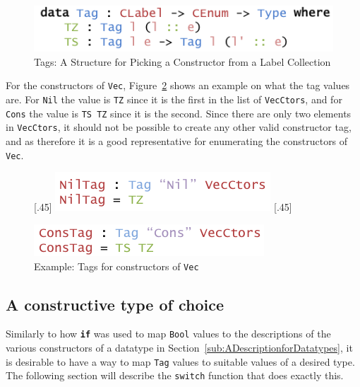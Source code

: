 \documentclass{ituthesis}
\newcommand{\ttconstructor}[1]{\textcolor{constructor-color}{\texttt{#1}}}
\newcommand{\tttype}[1]{\textcolor{type-color}{\texttt{#1}}}
\newcommand{\ttdec}[1]{\textcolor{declared-var-color}{\texttt{#1}}}
\theoremstyle{break}
\begin{document}
\begin{figure}[ht]
\begin{center}
    \includegraphics[scale=0.5]{Figures/AnInformativeEncodingofConstructorsTags.png}
\end{center}
\caption{Tags: A Structure for Picking a Constructor from a Label Collection}
\label{fig:ctortags}
\end{figure}

For the constructors of \tttype{Vec}, Figure~\ref{fig:vecctor} shows an example on what the tag values are. For \ttconstructor{Nil} the value is \ttconstructor{TZ} since it is the first in the list of \ttdec{VecCtors}, and for \ttconstructor{Cons} the value
is \ttconstructor{TS~TZ} since it is the second. Since there are only two elements in \ttdec{VecCtors}, it should not be possible to create any other valid constructor tag, and as therefore it is a good representative for enumerating the constructors of \tttype{Vec}.

\begin{figure}[ht]
\begin{center}
  \subcaptionbox{Tag for \ttconstructor{Nil}\label{fig:vecctornil}}[.45\textwidth]{
    \includegraphics[scale=0.5]{Figures/VectorNilTag.png}
}
\subcaptionbox{Tag for \ttconstructor{Cons}\label{fig:vecctorcons}}[.45\textwidth]{
    \includegraphics[scale=0.5]{Figures/VectorConsTag.png}

}
\caption{Example: Tags for constructors of \tttype{Vec}}
\label{fig:vecctor}
\end{center}
\end{figure}


\subsection{A constructive type of choice}
\label{sub:AConstructiveTypeofChoice}
Similarly to how \texttt{\textbf{if}} was used to map \tttype{Bool} values to the descriptions of the various constructors of a datatype in Section~\ref{sub:ADescriptionforDatatypes}, it is desirable to have a way
to map \tttype{Tag} values to suitable values of a desired type.  The following section will describe the \ttdec{switch} function that does exactly this.
\end{document}
